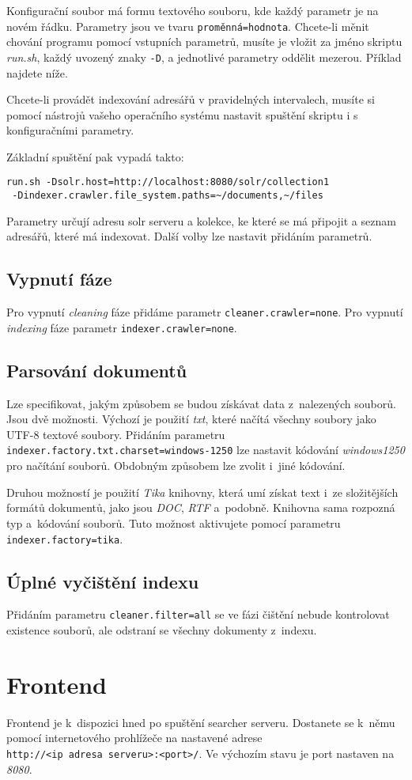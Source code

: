 Konfigurační soubor má formu textového souboru, kde každý parametr je na novém řádku. Parametry jsou ve tvaru \verb|proměnná=hodnota|. Chcete-li měnit chování programu pomocí vstupních parametrů, musíte je vložit za jméno skriptu \emph{run.sh}, každý uvozený znaky \verb|-D|, a jednotlivé parametry oddělit mezerou. Příklad najdete níže.
 
Chcete-li provádět indexování adresářů v pravidelných intervalech, musíte si pomocí nástrojů vašeho operačního systému nastavit spuštění skriptu i s konfiguračními parametry. 

Základní spuštění pak vypadá takto:
\begin{verbatim}
run.sh -Dsolr.host=http://localhost:8080/solr/collection1 
 -Dindexer.crawler.file_system.paths=~/documents,~/files
\end{verbatim}
Parametry určují adresu solr serveru a kolekce, ke které se má připojit a seznam adresářů, které má indexovat. Další volby lze nastavit přidáním parametrů.

\subsection{Vypnutí fáze}
Pro vypnutí \emph{cleaning} fáze přidáme parametr \verb|cleaner.crawler=none|. Pro vypnutí \emph{indexing} fáze parametr \verb|indexer.crawler=none|.

\subsection{Parsování dokumentů}
Lze specifikovat, jakým způsobem se budou získávat data z~nalezených souborů. Jsou dvě možnosti. Výchozí je použití \emph{txt}, které načítá všechny soubory jako UTF-8 textové soubory. Přidáním parametru \\\verb|indexer.factory.txt.charset=windows-1250| lze nastavit kódování \emph{windows1250} pro načítání souborů. Obdobným způsobem lze zvolit i~jiné kódování.

Druhou možností je použití \emph{Tika} knihovny, která umí získat text i~ze složitějších formátů dokumentů, jako jsou \emph{DOC}, \emph{RTF} a~podobně. Knihovna sama rozpozná typ a~kódování souborů. Tuto možnost aktivujete pomocí parametru \verb|indexer.factory=tika|.

\subsection{Úplné vyčištění indexu}
Přidáním parametru \verb|cleaner.filter=all| se ve fázi čištění nebude kontrolovat existence souborů, ale odstraní se všechny dokumenty z~indexu.

\section{Frontend}
Frontend je k~dispozici hned po spuštění searcher serveru. Dostanete se k~němu pomocí internetového prohlížeče na nastavené adrese \\ \verb|http://<ip adresa serveru>:<port>/|. Ve výchozím stavu je port nastaven na \emph{8080}.